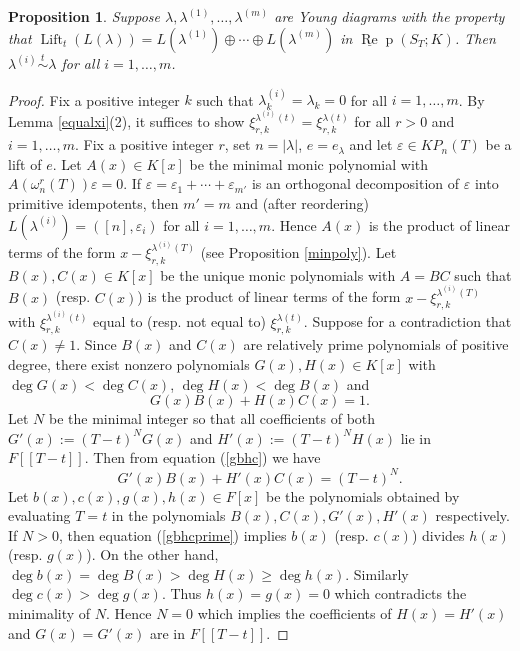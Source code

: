 \documentclass{amsart}
\newtheorem{proposition}[theorem]{Proposition}
\theoremstyle{definition}
\def\uRep{\underline{\operatorname{Re}}\!\operatorname{p}}
\newcommand{\Lift}{\operatorname{Lift}}
\renewcommand{\1}{_{(1)}}
\renewcommand{\2}{_{(2)}}
\newcommand{\3}{_{(3)}}
\newcommand{\4}{_{(4)}}
\newcommand{\ep}{\varepsilon}
\begin{document}
\begin{proposition}\label{liftsim} Suppose $\lambda, \lambda^{(1)},\ldots, \lambda^{(m)}$ are Young diagrams with the property  that $\Lift_t(L(\lambda))=L(\lambda^{(1)})\oplus\cdots\oplus L(\lambda^{(m)})$ in $\uRep(S_T; K)$.  Then $\lambda^{(i)}\stackrel{t}{\sim}\lambda$ for all $i=1,\ldots, m$.  
\end{proposition}

\begin{proof} Fix a positive integer $k$ such that $\lambda^{(i)}_k=\lambda_k=0$ for all $i=1,\ldots, m$.  By Lemma \ref{equalxi}(2), it suffices to show $\xi^{\lambda^{(i)}(t)}_{r, k}=\xi^{\lambda(t)}_{r, k}$ for all $r>0$ and $i=1,\ldots, m$.  Fix a positive integer $r$, set $n=|\lambda|$, $e=e_\lambda$ and let $\ep\in KP_n(T)$ be a lift of $e$.  Let $A(x)\in K[x]$ be the minimal monic polynomial with $A(\omega_n^r(T))\ep=0$.  If $\ep=\ep_1+\cdots+\ep_{m'}$ is an orthogonal decomposition of $\ep$ into primitive idempotents, then $m'=m$ and (after reordering) $L(\lambda^{(i)})=([n], \ep_i)$ for all $i=1,\ldots, m$.  Hence $A(x)$ is the product of linear terms of the form $x-\xi^{\lambda^{(i)}(T)}_{r, k}$ (see Proposition \ref{minpoly}).  Let $B(x), C(x)\in K[x]$ be the unique monic polynomials with $A=BC$ such that $B(x)$ (resp. $C(x)$) is the product of linear terms of the form $x-\xi^{\lambda^{(i)}(T)}_{r, k}$ with $\xi^{\lambda^{(i)}(t)}_{r, k}$ equal to (resp. not equal to) $\xi^{\lambda(t)}_{r, k}$.  Suppose for a contradiction that $C(x)\not=1$.  Since $B(x)$ and $C(x)$ are relatively prime polynomials of positive degree, there exist nonzero polynomials $G(x), H(x)\in K[x]$ with $\deg G(x)<\deg C(x)$,  $\deg H(x)<\deg B(x)$ and \begin{equation}\label{gbhc}G(x)B(x)+H(x)C(x)=1.\end{equation}  Let $N$ be the minimal integer so that all coefficients of both $G'(x):=(T-t)^NG(x)$ and $H'(x):=(T-t)^NH(x)$ lie  in $F[[T-t]]$.  Then from equation (\ref{gbhc}) we have \begin{equation}\label{gbhcprime}G'(x)B(x)+H'(x)C(x)=(T-t)^N.\end{equation}
Let $b(x), c(x), g(x), h(x)\in F[x]$ be the polynomials obtained by evaluating $T=t$ in the polynomials $B(x), C(x), G'(x), H'(x)$ respectively.  If $N>0$, then equation (\ref{gbhcprime}) implies $b(x)$ (resp. $c(x)$) divides $h(x)$ (resp. $g(x)$).  On the other hand, $\deg b(x)=\deg B(x)>\deg H(x)\geq\deg h(x)$.  Similarly $\deg c(x)>\deg g(x)$.  Thus $h(x)=g(x)=0$ which contradicts the minimality of $N$.  Hence $N=0$ which implies the coefficients of $H(x)=H'(x)$ and $G(x)=G'(x)$ are in $F[[T-t]]$. 

\end{proof}
\end{document}
